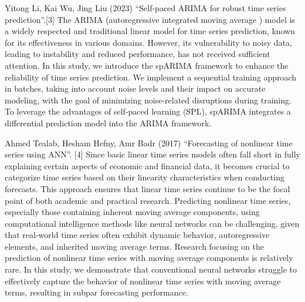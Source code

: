         Yitong Li, Kai Wu, Jing Liu (2023) “Self-paced ARIMA for robust time series prediction”.[3] The  ARIMA (autoregressive integrated moving average ) model is a widely respected and traditional linear model for time series prediction, known for its effectiveness in various domains. However, its vulnerability to noisy data, leading to instability and reduced performance, has not received sufficient attention. In this study, we introduce the spARIMA framework to enhance the reliability of time series prediction. We implement a sequential training approach in batches, taking into account noise levels and their impact on accurate modeling, with the goal of minimizing noise-related disruptions during training. To leverage the advantages of self-paced learning (SPL), spARIMA integrates a differential prediction model into the ARIMA framework.
        
        Ahmed Tealab, Hesham Hefny, Amr Badr (2017) “Forecasting of nonlinear time series using ANN”. [4] Since basic linear time series models often fall short in fully explaining certain aspects of economic and financial data, it becomes crucial to categorize time series based on their linearity characteristics when conducting forecasts. This approach ensures that linear time series continue to be the focal point of both academic and practical research. Predicting nonlinear time series, especially those containing inherent moving average components, using computational intelligence methods like neural networks can be challenging, given that real-world time series often exhibit dynamic behavior, autoregressive elements, and inherited moving average terms. Research focusing on the prediction of nonlinear time series with moving average components is relatively rare. In this study, we demonstrate that conventional neural networks struggle to effectively capture the behavior of nonlinear time series with moving average terms, resulting in subpar forecasting performance.
        
